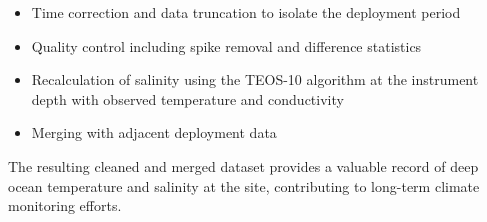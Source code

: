 \begin{itemize}
    \item Time correction and data truncation to isolate the deployment period
    \item Quality control including spike removal and difference statistics
    \item Recalculation of salinity using the TEOS-10 algorithm at the instrument depth with observed temperature and conductivity
    \item Merging with adjacent deployment data %
\end{itemize}

The resulting cleaned and merged dataset provides a valuable record of deep ocean temperature and salinity 
at the \projectname{} site, contributing to long-term climate monitoring efforts.
